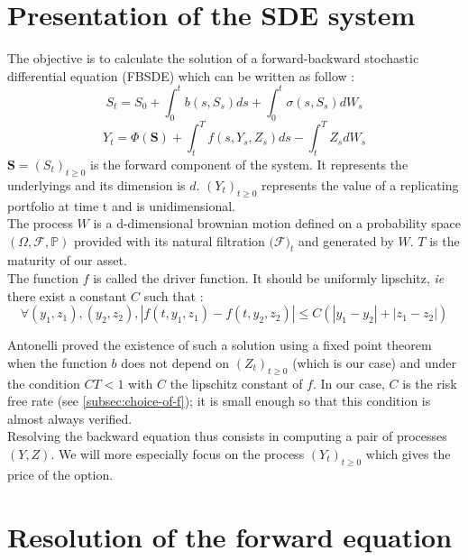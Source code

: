 \documentclass[a4paper,11pt,english]{book}
\begin{document}
\section{Presentation of the SDE system}
\label{sec:SDE-presentation}
The objective is to calculate the solution of  a forward-backward stochastic differential equation (FBSDE) which can be written as follow :
$$S_{t} = S_{0}+\int_{0}^{t}b(s,S_{s})ds +\int_{0}^{t} \sigma(s,S_{s})dW_{s}$$
$$Y_{t} = \Phi(\textbf{S}) + \int_{t}^{T}f(s,Y_{s},Z_{s})ds -\int_{t}^{T}Z_{s}dW_{s}$$
$\textbf{S}=(S_{t})_{t\geq0}$ is the forward component of the system. It represents the underlyings and its dimension is $d$. $(Y_{t})_{t\geq0}$ represents the value of a replicating portfolio at time t and is unidimensional.\\
The process $W$ is a d-dimensional brownian motion defined on a probability space $(\Omega,\mathcal{F},\mathbb{P})$ provided with its natural filtration $(\mathcal{F)}_{t}$ and generated by $W$. 
$T$ is the maturity of our asset.\\

The function $f$ is called the driver function. It should be uniformly lipschitz, \textit{ie} there exist a constant $C$ such that :
$$\forall (y_{1},z_{1}),(y_{2},z_{2}), |f(t,y_{1},z_{1})-f(t,y_{2},z_{2})|\leq C(|y_{1}-y_{2}|+|z_{1}-z_{2}|)$$

Antonelli \cite{antonelli1993backward} proved the existence of such a solution using a fixed point theorem when the function $b$ does not depend on $(Z_{t})_{t\geq0}$ (which is our case) and under the condition $CT<1$ with $C$ the lipschitz constant of $f$. In our case, $C$ is the risk free rate (see \ref{subsec:choice-of-f}); it is small enough so that this condition is almost always verified.\\

Resolving the backward equation thus consists in computing a pair of processes $(Y,Z)$. We will more especially focus on the process $(Y_{t})_{t\geq0}$ which gives the price of the option.

\section{Resolution of the forward equation}
\end{document}
